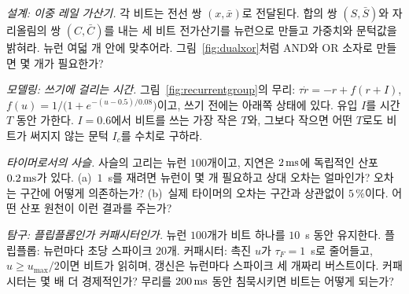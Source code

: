 \begin{exercise}[\lvlB]
\label{ex:02:4}
\emph{설계: 이중 레일 가산기.} 각 비트는 전선 쌍 $(x,\bar x)$로 전달된다. 합의 쌍 $(S,\bar S)$와 자리올림의 쌍 $(C,\bar C)$를 내는 세 비트 전가산기를  뉴런으로 만들고 가중치와 문턱값을 밝혀라. 뉴런 여덟 개 안에 맞추어라. 그림~\ref{fig:dualxor}처럼 AND와 OR 소자로 만들면 몇 개가 필요한가?
\end{exercise}

\begin{exercise}[\lvlB]
\label{ex:02:5}
\emph{모델링: 쓰기에 걸리는 시간.} 그림~\ref{fig:recurrentgroup}의 무리: $\tau\dot r=-r+f(r+I)$, $f(u)=1/\bigl(1+e^{-(u-0.5)/0.08}\bigr)$이고, 쓰기 전에는 아래쪽 상태에 있다. 유입 $I$를 시간 $T$ 동안 가한다. $I=0.6$에서 비트를 쓰는 가장 작은 $T$와, 그보다 작으면 어떤 $T$로도 비트가 써지지 않는 문턱 $I_c$를 수치로 구하라.
\end{exercise}

\begin{exercise}[\lvlA]
\label{ex:02:6}
\emph{타이머로서의 사슬.} 사슬의 고리는  뉴런 $100$개이고, 지연은 $2\,\text{ms}$에 독립적인 산포 $0.2\,\text{ms}$가 있다. (a)~$1$~s를 재려면 뉴런이 몇 개 필요하고 상대 오차는 얼마인가? 오차는 구간에 어떻게 의존하는가? (b)~실제 타이머의 오차는 구간과 상관없이 $5\,\%$이다. 어떤 산포 원천이 이런 결과를 주는가?
\end{exercise}

\begin{exercise}[\lvlC]
\label{ex:02:7}
\emph{탐구: 플립플롭인가 커패시터인가.} 뉴런 $100$개가 비트 하나를 $10$~s 동안 유지한다. 플립플롭: 뉴런마다 초당 스파이크 $20$개. 커패시터: 촉진 $u$가 $\tau_F=1$~s로 줄어들고, $u\ge u_{\max}/2$이면 비트가 읽히며, 갱신은 뉴런마다 스파이크 세 개짜리 버스트이다. 커패시터는 몇 배 더 경제적인가? 무리를 $200\,\text{ms}$ 동안 침묵시키면 비트는 어떻게 되는가?
\end{exercise}
